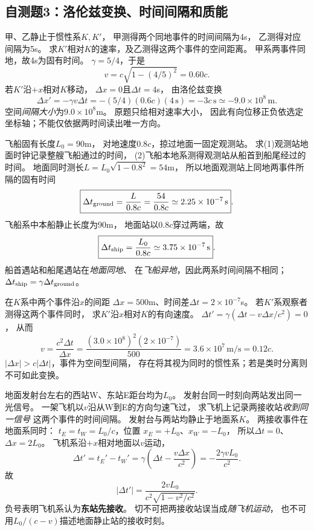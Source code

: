 \subsection{自测题3：洛伦兹变换、时间间隔和质能}

\problemtext 甲、乙静止于惯性系$K,K'$，
甲测得两个同地事件的时间间隔为4s，
乙测得对应间隔为5s。
求$K'$相对$K$的速率，及乙测得这两个事件的空间距离。
\workings
甲系两事件同地，故4s为固有时间。
$\gamma=5/4$，于是
\[
\boxed{v=c\sqrt{1-(4/5)^2}=0.60c}.
\]
若$K'$沿$+x$相对$K$移动，
$\Delta x=0$且$\Delta t=4$s，
由洛伦兹变换
\[
\boxed{\Delta x'=-\gamma v\Delta t
=-(5/4)(0.6c)(4\,\mathrm s)
=-3c\,\mathrm s\simeq-9.0\times10^8\,\mathrm m}.
\]
空间\emph{间隔大小}为$9.0\times10^8$m。
\crosscheck 原题只给相对速率大小，
因此有向位移正负依选定坐标轴；不能仅依据两时间读出唯一方向。

\problemtext 飞船固有长度$L_0=90$m，
对地速度$0.8c$，掠过地面一固定观测站。
求(1)观测站地面时钟记录整艘飞船通过的时间，
(2)飞船本地系测得观测站从船首到船尾经过的时间。
\workings
地面同时测长$L=L_0\sqrt{1-0.8^2}=54$m，
所以地面观测站上同地两事件所隔的固有时间
\[
\boxed{\Delta t_{\rm ground}=
\frac L{0.8c}=\frac{54}{0.8c}
\simeq2.25\times10^{-7}\,\mathrm s}.
\]
飞船系中本船静止长度为90m，
地面站以$0.8c$穿过两端，故
\[
\boxed{\Delta t_{\rm ship}=
\frac{L_0}{0.8c}
\simeq3.75\times10^{-7}\,\mathrm s}.
\]
\crosscheck 船首遇站和船尾遇站在\emph{地面同地}、
在\emph{飞船异地}，因此两系时间间隔不相同；
$\Delta t_{\rm ship}=\gamma\Delta t_{\rm ground}$。

\problemtext 在$K$系中两个事件沿$x$的间距
$\Delta x=500$m、时间差$\Delta t=2\times10^{-7}$s。
若$K'$系观察者测得这两个事件同时，
求$K'$沿$x$相对$K$的有向速度。
\workings
$\Delta t'=\gamma(\Delta t-v\Delta x/c^2)=0$，
从而
\[
\boxed{v=\frac{c^2\Delta t}{\Delta x}
=\frac{(3.0\times10^8)^2(2\times10^{-7})}{500}
=3.6\times10^7\,\mathrm{m/s}=0.12c}.
\]
\crosscheck $|\Delta x|>c|\Delta t|$，事件为空间型间隔，
存在将其视为同时的惯性系；若是类时分离则不可如此变换。

\problemtext 地面发射台左右的西站W、东站E距台均为$L_0$。
发射台同一时刻向两站发出同一光信号。
一架飞机以$v$沿从W到E的方向匀速飞过，
求飞机上记录两接收站\emph{收到同一信号}
这两个事件的时间间隔。
\workings
发射台与两站均静止于地面系$K$。
两接收事件在地面系同时：
$t_E=t_W=L_0/c$，位置
$x_E=+L_0$、$x_W=-L_0$，
所以$\Delta t=0$、$\Delta x=2L_0$。
飞机系沿$+x$相对地面以$v$运动，
\[
\Delta t'=t_E'-t_W'
=\gamma\left(\Delta t-\frac{v\Delta x}{c^2}\right)
=-\frac{2\gamma vL_0}{c^2}.
\]
故
\[
\boxed{|\Delta t'|=
\frac{2vL_0}{c^2\sqrt{1-v^2/c^2}}}.
\]
负号表明飞机系认为\textbf{东站先接收}。
\crosscheck 切不可把两接收站误当成\emph{随飞机运动}，
也不可用$L_0/(c-v)$描述地面静止站的接收时刻。

